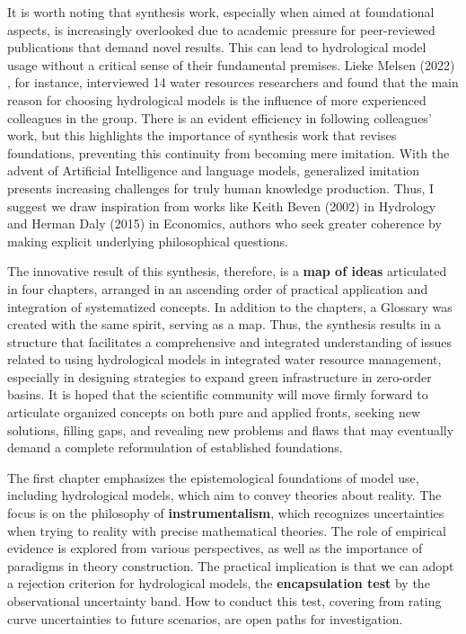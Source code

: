 \documentclass[./main_en.tex]{subfiles}
\begin{document}
\par It is worth noting that synthesis work, especially when aimed at foundational aspects, is increasingly overlooked due to academic pressure for peer-reviewed publications that demand novel results. This can lead to hydrological model usage without a critical sense of their fundamental premises. Lieke Melsen (2022) \cite{Melsen2022}, for instance, interviewed 14 water resources researchers and found that the main reason for choosing hydrological models is the influence of more experienced colleagues in the group. There is an evident efficiency in following colleagues' work, but this highlights the importance of synthesis work that revises foundations, preventing this continuity from becoming mere imitation. With the advent of Artificial Intelligence and language models, generalized imitation presents increasing challenges for truly human knowledge production. Thus, I suggest we draw inspiration from works like Keith Beven (2002) \cite{Beven2002a} in Hydrology and Herman Daly (2015) \cite{Daly2015a} in Economics, authors who seek greater coherence by making explicit underlying philosophical questions.

\par The innovative result of this synthesis, therefore, is a \textbf{map of ideas} articulated in four chapters, arranged in an ascending order of practical application and integration of systematized concepts. In addition to the chapters, a Glossary was created with the same spirit, serving as a map. Thus, the synthesis results in a structure that facilitates a comprehensive and integrated understanding of issues related to using hydrological models in integrated water resource management, especially in designing strategies to expand green infrastructure in zero-order basins. It is hoped that the scientific community will move firmly forward to articulate organized concepts on both pure and applied fronts, seeking new solutions, filling gaps, and revealing new problems and flaws that may eventually demand a complete reformulation of established foundations.

\par The first chapter emphasizes the epistemological foundations of model use, including hydrological models, which aim to convey theories about reality. The focus is on the philosophy of \textbf{instrumentalism}, which recognizes uncertainties when trying to  reality with precise mathematical theories. The role of empirical evidence is explored from various perspectives, as well as the importance of paradigms in theory construction. The practical implication is that we can adopt a rejection criterion for hydrological models, the \textbf{encapsulation test} by the observational uncertainty band. How to conduct this test, covering from rating curve uncertainties to future scenarios, are open paths for investigation.
\end{document}
